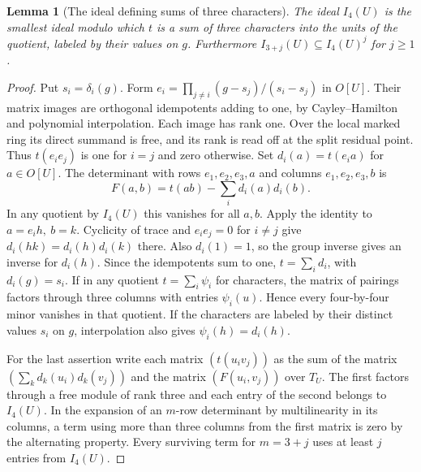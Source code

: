 \documentclass[a4paper,11pt]{article}
\newtheorem{lemma}[proposition]{Lemma}
\theoremstyle{definition}
\theoremstyle{remark}
\numberwithin{equation}{section}
\begin{document}
\begin{lemma}[The ideal defining sums of three characters]
\label{lem:charideal373}
The ideal \(I_4(U)\) is the smallest ideal modulo which \(t\)
is a sum of three characters into the units of the quotient,
labeled by their values on \(g\). Furthermore
\(I_{3+j}(U)\subseteq I_4(U)^j\) for \(j\ge1\).
\end{lemma}
\begin{proof}
Put \(s_i=\delta_i(g)\). Form
\(e_i=\prod_{j\ne i}(g-s_j)/(s_i-s_j)\) in \(O[U]\).
Their matrix images are orthogonal idempotents adding to one,
by Cayley--Hamilton and polynomial interpolation. Each image
has rank one. Over the local marked ring its direct summand
is free, and its rank is read off at the split residual point.
Thus \(t(e_i e_j)\) is one for \(i=j\) and zero otherwise.
Set \(d_i(a)=t(e_i a)\) for \(a\in O[U]\). The determinant with
rows \(e_1,e_2,e_3,a\) and columns \(e_1,e_2,e_3,b\) is
\[
                  F(a,b)=t(ab)-\sum_i d_i(a)d_i(b).
\]
In any quotient by \(I_4(U)\) this vanishes for all \(a,b\).
Apply the identity to \(a=e_i h,\ b=k\). Cyclicity of trace
and \(e_i e_j=0\) for \(i\ne j\) give
\(d_i(hk)=d_i(h)d_i(k)\) there. Also \(d_i(1)=1\), so the
group inverse gives an inverse for \(d_i(h)\). Since the
idempotents sum to one, \(t=\sum_i d_i\), with
\(d_i(g)=s_i\). If in any quotient \(t=\sum_i\psi_i\) for
characters, the matrix of pairings factors through three
columns with entries \(\psi_i(u)\). Hence every
four-by-four minor vanishes in that quotient. If the
characters are labeled by their distinct values \(s_i\) on
\(g\), interpolation also gives \(\psi_i(h)=d_i(h)\).

For the last assertion write each matrix \((t(u_i v_j))\)
as the sum of the matrix \((\sum_k d_k(u_i)d_k(v_j))\)
and the matrix \((F(u_i,v_j))\) over \(T_U\).
The first factors through a free module of rank three and
each entry of the second belongs to \(I_4(U)\).
In the expansion of an \(m\)-row determinant by multilinearity
in its columns, a term using more than three columns from the
first matrix is zero by the alternating property. Every surviving
term for \(m=3+j\) uses at least \(j\) entries from \(I_4(U)\).
\end{proof}
\end{document}
